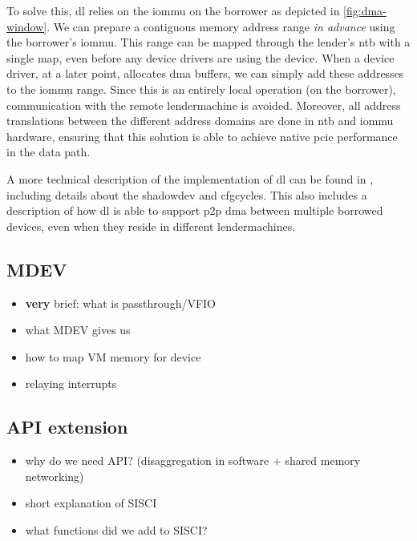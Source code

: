 To solve this, \gls{dl} relies on the \gls{iommu} on the \gls{borrower} as depicted in \cref{fig:dma-window}.
%
We can prepare a contiguous memory address range \emph{in advance} using the \gls{borrower}'s \gls{iommu}.
%
This range can be mapped through the \gls{lender}'s \gls{ntb} with a single map, even before any device drivers are using the device.
%
When a device driver, at a later point, allocates \gls{dma} buffers, we can simply add these addresses to the \gls{iommu} range.
%
Since this is an entirely local operation (on the \gls{borrower}), communication with the remote \gls{lendermachine} is avoided.
%
Moreover, all address translations between the different address domains are done in \gls{ntb} and \gls{iommu} hardware, ensuring that this solution is able to achieve native \gls{pcie} performance in the data path.



A more technical description of the implementation of \gls{dl} can be found in , including details about the \gls{shadowdev} and \glspl{cfgcycle}.
%
This also includes a description of how \gls{dl} is able to support \gls{p2p} \gls{dma} between multiple borrowed devices, even when they reside in different \glspl{lendermachine}.



\subsection{MDEV}\label{sec:mdev}
\begin{itemize}
    \item \textbf{very} brief: what is passthrough/VFIO
    \item what MDEV gives us
    \item how to map VM memory for device
    \item relaying interrupts
\end{itemize}

\subsection{API extension}\label{sec:api}
\begin{itemize}
    \item why do we need API? (disaggregation in software + shared memory networking)
    \item short explanation of SISCI
    \item what functions did we add to SISCI?
\end{itemize}



